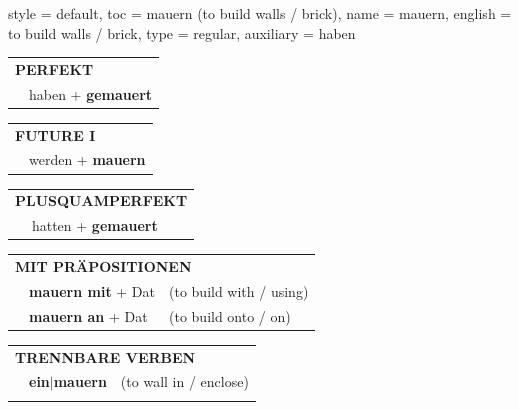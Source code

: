 \begin{verbentry}{
  style = {default},
  toc = {mauern (to build walls / brick)},
  name = {mauern},
  english = {to build walls / brick},
  type = {regular},
  auxiliary = {haben}
}
 \begin{tabular}{rl}
     \multicolumn{2}{l}{\textbf{PERFEKT}}\\
   & haben + \textbf{gemauert}\\
  \end{tabular}
\hfill
\begin{tabular}{rl}
    \multicolumn{2}{l}{\textbf{FUTURE I}}\\
   & werden + \textbf{mauern}\\
  \end{tabular}
\hfill
\begin{tabular}{rl}
    \multicolumn{2}{l}{\textbf{PLUSQUAMPERFEKT}}\\
   & hatten + \textbf{gemauert}\\
  \end{tabular}

 \vspace{10pt}

\begin{tabular}{lll}
      \multicolumn{3}{l}{\textbf{MIT PRÄPOSITIONEN}}\\
& \textbf{mauern mit} + Dat & (to build with / using)\\
& \textbf{mauern an} + Dat & (to build onto / on)\\
\end{tabular}
  \hfill
\begin{tabular}{lll}
      \multicolumn{3}{l}{\textbf{TRENNBARE VERBEN}}\\
 & \textbf{ein$|$mauern} & (to wall in / enclose)\\
\vspace{10pt}
  \end{tabular}

  \vspace{-5pt}
\end{verbentry}

